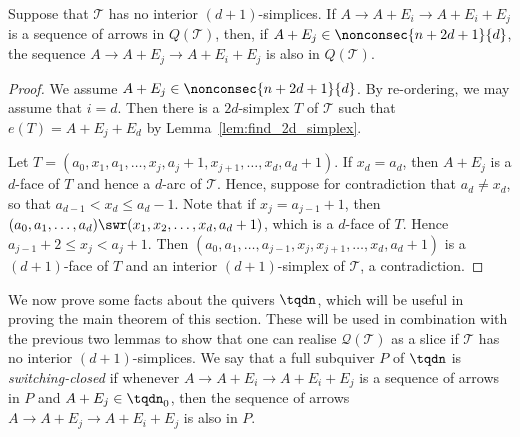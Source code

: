 \begin{lemma}\label{lem:simp_arrow_switch}
Suppose that $\mathcal{T}$ has no interior $(d+1)$-simplices. If $A \rightarrow A + E_{i} \rightarrow A + E_{i} + E_{j}$ is a sequence of arrows in $Q(\mathcal{T})$, then, if $A + E_{j} \in \nonconsec{n+2d+1}{d}$, the sequence $A \rightarrow A + E_{j} \rightarrow A + E_{i} + E_{j}$ is also in $Q(\mathcal{T})$.
\end{lemma}
\begin{proof}
We assume $A + E_{j} \in \nonconsec{n+2d+1}{d}$. By re-ordering, we may assume that $i = d$. Then there is a $2d$-simplex $T$ of $\mathcal{T}$ such that $e(T) = A + E_{j} + E_{d}$ by Lemma~\ref{lem:find_2d_simplex}.

Let $T = (a_{0}, x_{1}, a_{1}, \dots, x_{j}, a_{j} + 1, x_{j + 1}, \dots, x_{d}, a_{d} + 1)$. If $x_{d} = a_{d}$, then $A + E_{j}$ is a $d$-face of $T$ and hence a $d$-arc of $\mathcal{T}$. Hence, suppose for contradiction that $a_{d} \neq x_{d}$, so that $a_{d - 1} < x_{d} \leqslant a_{d} - 1$. Note that if $x_{j} = a_{j - 1} + 1$, then $(a_{0}, a_{1}, \dots , a_{d}) \swr (x_{1}, x_{2}, \dots ,x_{d}, a_{d} + 1)$, which is a $d$-face of $T$. Hence $a_{j - 1} + 2 \leqslant x_{j} < a_{j} + 1$. Then $(a_{0}, a_{1}, \dots, a_{j - 1}, x_{j}, x_{j + 1}, \dots , x_{d}, a_{d} + 1)$ is a $(d + 1)$-face of $T$ and an interior $(d+1)$-simplex of $\mathcal{T}$, a contradiction.
\end{proof}

We now prove some facts about the quivers $\tqdn$, which will be useful in proving the main theorem of this section. These will be used in combination with the previous two lemmas to show that one can realise $\mathcal{Q}(\mathcal{T})$ as a slice if $\mathcal{T}$ has no interior $(d + 1)$-simplices. We say that a full subquiver $P$ of $\tqdn$ is \emph{switching-closed} if whenever $A \rightarrow A + E_{i} \rightarrow A + E_{i} + E_{j}$ is a sequence of arrows in $P$ and $A + E_{j} \in \tqdn_{0}$, then the sequence of arrows $A \rightarrow A + E_{j} \rightarrow A + E_{i} + E_{j}$ is also in $P$.

